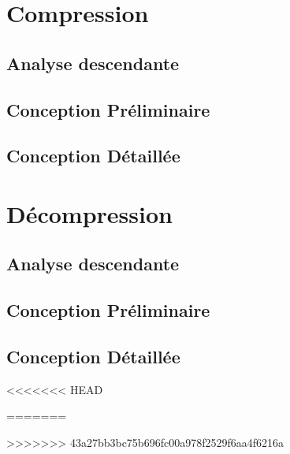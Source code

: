 \documentclass[10pt]{report}
\begin{document}
    \chapter{Compression}
        \section{Analyse descendante}
        \section{Conception Préliminaire}
            
            
            
           
             
            
			
            
           
        \section{Conception Détaillée}
            
            
            
           
            
          	
			
            
            
        \chapter{Décompression}
        \section{Analyse descendante}
        \section{Conception Préliminaire}
        	
        	
        	
        	
        \section{Conception Détaillée}
        	
<<<<<<< HEAD
        	
        	
        	
=======
        	
        	
        	
        	
        	
>>>>>>> 43a27bb3bc75b696fc00a978f2529f6aa4f6216a
\end{document}
